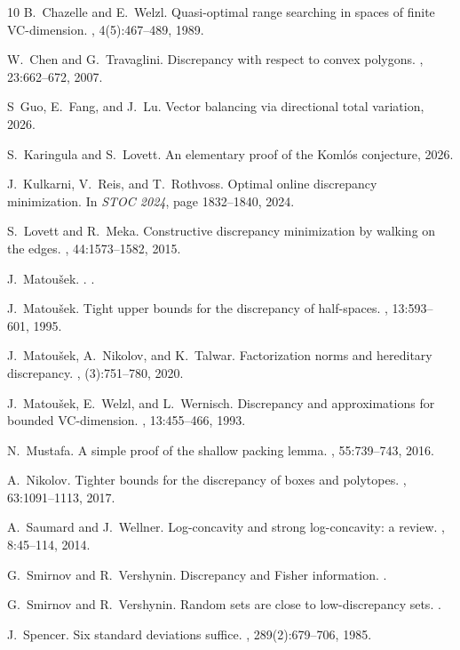 \begin{thebibliography}{10}
B.~Chazelle and E.~Welzl.
\newblock Quasi-optimal range searching in spaces of finite {VC}-dimension.
, 4(5):467--489, 1989.

W.~Chen and G.~Travaglini.
\newblock Discrepancy with respect to convex polygons.
, 23:662--672, 2007.

S~Guo, E.~Fang, and J.~Lu.
\newblock Vector balancing via directional total variation, 2026.

S.~Karingula and S.~Lovett.
\newblock An elementary proof of the {K}oml\'os conjecture, 2026.

J.~Kulkarni, V.~Reis, and T.~Rothvoss.
\newblock Optimal online discrepancy minimization.
\newblock In {\em STOC 2024}, page 1832--1840, 2024.

S.~Lovett and R.~Meka.
\newblock Constructive discrepancy minimization by walking on the edges.
, 44:1573--1582, 2015.

J.~Matou{\v{s}}ek.
.
.

J.~Matou\v{s}ek.
\newblock Tight upper bounds for the discrepancy of half-spaces.
, 13:593--601, 1995.

J.~Matou\v{s}ek, A.~Nikolov, and K.~Talwar.
\newblock Factorization norms and hereditary discrepancy.
, (3):751--780, 2020.

J.~Matou\v{s}ek, E.~Welzl, and L.~Wernisch.
\newblock Discrepancy and approximations for bounded {VC}-dimension.
, 13:455--466, 1993.

N.~Mustafa.
\newblock A simple proof of the shallow packing lemma.
, 55:739--743, 2016.

A.~Nikolov.
\newblock Tighter bounds for the discrepancy of boxes and polytopes.
, 63:1091--1113, 2017.

A.~Saumard and J.~Wellner.
\newblock Log-concavity and strong log-concavity: a review.
, 8:45--114, 2014.

G.~Smirnov and R.~Vershynin.
\newblock Discrepancy and {F}isher information.
.

G.~Smirnov and R.~Vershynin.
\newblock Random sets are close to low-discrepancy sets.
.

J.~Spencer.
\newblock Six standard deviations suffice.
, 289(2):679--706, 1985.

\end{thebibliography}
